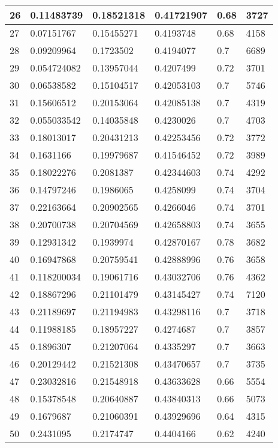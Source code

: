 \begin{longtable}{|l|l|l|l|l|l|}
26 & 0.11483739 & 0.18521318 & 0.41721907 & 0.68 & 3727 \\ \hline 
27 & 0.07151767 & 0.15455271 & 0.4193748 & 0.68 & 4158 \\ \hline 
28 & 0.09209964 & 0.1723502 & 0.4194077 & 0.7 & 6689 \\ \hline 
29 & 0.054724082 & 0.13957044 & 0.4207499 & 0.72 & 3701 \\ \hline 
30 & 0.06538582 & 0.15104517 & 0.42053103 & 0.7 & 5746 \\ \hline 
31 & 0.15606512 & 0.20153064 & 0.42085138 & 0.7 & 4319 \\ \hline 
32 & 0.055033542 & 0.14035848 & 0.4230026 & 0.7 & 4703 \\ \hline 
33 & 0.18013017 & 0.20431213 & 0.42253456 & 0.72 & 3772 \\ \hline 
34 & 0.1631166 & 0.19979687 & 0.41546452 & 0.72 & 3989 \\ \hline 
35 & 0.18022276 & 0.2081387 & 0.42344603 & 0.74 & 4292 \\ \hline 
36 & 0.14797246 & 0.1986065 & 0.4258099 & 0.74 & 3704 \\ \hline 
37 & 0.22163664 & 0.20902565 & 0.4266046 & 0.74 & 3701 \\ \hline 
38 & 0.20700738 & 0.20704569 & 0.42658803 & 0.74 & 3655 \\ \hline 
39 & 0.12931342 & 0.1939974 & 0.42870167 & 0.78 & 3682 \\ \hline 
40 & 0.16947868 & 0.20759541 & 0.42888996 & 0.76 & 3658 \\ \hline 
41 & 0.118200034 & 0.19061716 & 0.43032706 & 0.76 & 4362 \\ \hline 
42 & 0.18867296 & 0.21101479 & 0.43145427 & 0.74 & 7120 \\ \hline 
43 & 0.21189697 & 0.21194983 & 0.43298116 & 0.7 & 3718 \\ \hline 
44 & 0.11988185 & 0.18957227 & 0.4274687 & 0.7 & 3857 \\ \hline 
45 & 0.1896307 & 0.21207064 & 0.4335297 & 0.7 & 3663 \\ \hline 
46 & 0.20129442 & 0.21521308 & 0.43470657 & 0.7 & 3735 \\ \hline 
47 & 0.23032816 & 0.21548918 & 0.43633628 & 0.66 & 5554 \\ \hline 
48 & 0.15378548 & 0.20640887 & 0.43840313 & 0.66 & 5073 \\ \hline 
49 & 0.1679687 & 0.21060391 & 0.43929696 & 0.64 & 4315 \\ \hline 
50 & 0.2431095 & 0.2174747 & 0.4404166 & 0.62 & 4240 \\ \hline 
\end{longtable}